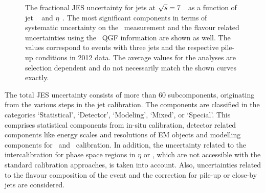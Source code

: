 \begin{figure}[tbp!]
\centering
{}
\caption[\gls{JES} uncertainties for $\sqrts=7$~\TeV\ data]{
%
The fractional \gls{JES} uncertainty for jets at $\sqrts=7$~\TeV\ as a function of jet \pt~ and $\eta$~. 
%
The most significant components in terms of systematic uncertainty on the \mt\ measurement and the flavour related uncertainties using the \dil\ \gls{QGF} information are shown as well.
%
The values correspond to events with three jets and the respective pile-up conditions in 2012 data. The average values for the analyses are selection dependent and do not necessarily match the shown curves exactly.
%
\label{fig:JES7TeV}
}
\end{figure}
%
The total \gls{JES} uncertainty consists of more than 60 subcomponents, originating from the various steps in the jet calibration. 
%
The components are classified in the categories `Statistical', `Detector', `Modeling', `Mixed', or `Special'. This comprises statistical components from in-situ calibration, detector related components like energy scales and resolutions of \gls{EM} objects and modelling components for \Gammaj\ and \Zj\ calibration. In addition, the uncertainty related to the intercalibration for phase space regions in $\eta$ or \pt, which are not accessible with the standard calibration approaches, is taken into account. Also, uncertainties related to the flavour composition of the event and the correction for pile-up or close-by jets are considered. 
